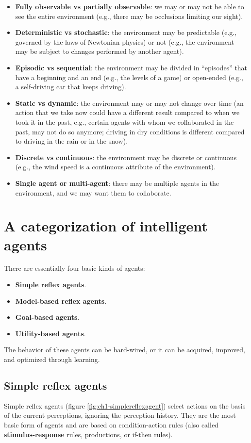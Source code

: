 \begin{itemize}
    \item \textbf{Fully observable vs partially observable}: we may or may not be able to see the entire environment (e.g., there may be occlusions limiting our sight).
    \item \textbf{Deterministic vs stochastic}: the environment may be predictable (e.g., governed by the laws of Newtonian physics) or not (e.g., the environment may be subject to changes performed by another agent).
    \item \textbf{Episodic vs sequential}: the environment may be divided in “episodes” that have a beginning and an end (e.g., the levels of a game) or open-ended (e.g., a self-driving car that keeps driving).
    \item \textbf{Static vs dynamic}: the environment may or may not change over time (an action that we take now could have a different result compared to when we took it in the past, e.g., certain agents with whom we collaborated in the past, may not do so anymore; driving in dry conditions is different compared to driving in the rain or in the snow).
    \item \textbf{Discrete vs continuous}: the environment may be discrete or continuous (e.g., the wind speed is a continuous attribute of the environment).
    \item \textbf{Single agent or multi-agent}: there may be multiple agents in the environment, and we may want them to collaborate.
\end{itemize}

\section{A categorization of intelligent agents}
There are essentially four basic kinds of agents:

\begin{itemize}
    \item \textbf{Simple reflex agents}.
    \item \textbf{Model-based reflex agents}.
    \item \textbf{Goal-based agents}.
    \item \textbf{Utility-based agents}.
\end{itemize}

The behavior of these agents can be hard-wired, or it can be acquired, improved, and optimized through learning.

\subsection{Simple reflex agents}
Simple reflex agents (figure \ref{fig:ch1-simplereflexagent}) select actions on the basis of the current perceptions, ignoring the perception history. They are the most basic form of agents and are based on condition-action rules (also called \textbf{stimulus-response} rules, productions, or if-then rules).


